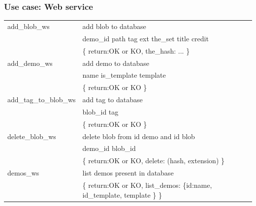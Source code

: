 \subsubsection{Use case: Web service}

\begin{flushleft}
\begin{longtable}
                   {|C{\tabcolsep}
                     ||
                    L{\tabcolsep}|}
  \hline
  {add\_blob\_ws}
                  & add blob to database \\
                  & {demo\_id path tag ext the\_set title credit} \\
                  & {\{  return:OK or KO, the\_hash: ...  \}} \\
  \hline
  {add\_demo\_ws}
                  & add demo to database \\
                  & {name is\_template template }\\
                  & { \{ return:OK or KO \} }\\
  \hline
  {add\_tag\-\_to\_blob\_ws}
                  & add tag to database \\
                  & { blob\_id tag }\\
                  & { \{ return:OK or KO \} }\\
  \hline
  {delete\_blob\_ws}
                  & delete blob from id demo and id blob \\
                  & {demo\_id blob\_id} \\
                  & { \{ return:OK or KO, delete: (hash, extension) \}} \\
  \hline
  {demos\_ws}
                  & list demos present  in database \\
                  & {\{ return:OK or KO,
                        list\_demos: \{id:name, id\_template, template \} \}} \\

\end{longtable}
\end{flushleft}
